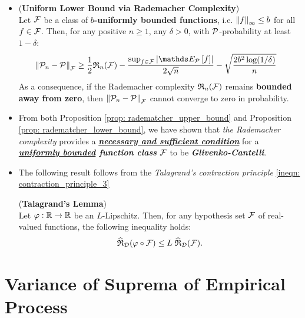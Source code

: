 \documentclass[11pt]{article}
\begin{document}
\begin{itemize}
\item \begin{proposition}\label{prop: radematcher_lower_bound}  (\textbf{Uniform Lower Bound via Rademacher Complexity}) \citep{wainwright2019high}\\
Let ${\mathcal F}$ be a class of \textbf{$b$-uniformly bounded functions}, i.e. $\left\|f\right\|_{\infty} \le b$ for all $f \in {\mathcal F}$. Then, for any positive $n \ge 1$, any $\delta > 0$, with ${\mathcal P}$-probability at least $1 - \delta$:
\begin{align}
\norm{\cP_n - \cP}{\cF} &\ge  \frac{1}{2} \frR_{n}(\cF)  - \frac{\sup_{f \in \cF}\abs{\E{\cP}{f}}}{2\sqrt{n}} - \sqrt{\frac{2 b^2 \log(1 / \delta)}{n}} \label{eqn: Rademacher_lower_bound}
\end{align} As a consequence, if the Rademacher complexity ${\mathfrak R}_n({\mathcal F})$ remains \textbf{bounded away from zero}, then $\left\|{\mathcal P}_n - {\mathcal P}\right\|_{{\mathcal F}}$ cannot
converge to zero in probability. 
\end{proposition}

\item \begin{remark} 
From both Proposition \ref{prop: radematcher_upper_bound} and Proposition \ref{prop: radematcher_lower_bound},  we have shown that \emph{the Rademacher complexity} provides a \underline{\emph{\textbf{necessary and sufficient condition}}} for a \emph{\textbf{\underline{uniformly bounded} function class} ${\mathcal F}$}  to be \emph{\textbf{Glivenko-Cantelli}}.
\end{remark}

\item The following result follows from the \emph{Talagrand's contraction principle} \eqref{ineqn: contraction_principle_3}
\begin{lemma} (\textbf{Talagrand's Lemma}) \citep{mohri2012foundations}\\
Let $\varphi: {\mathbb R} \to {\mathbb R}$ be an $L$-Lipschitz. Then, for any hypothesis set ${\mathcal F}$ of real-valued functions, the following inequality holds:
\begin{align}
\widehat{{\mathfrak R}}_{{\mathcal D}}(\varphi \circ {\mathcal F}) \le L \;\widehat{{\mathfrak R}}_{{\mathcal D}}({\mathcal F}). \label{ineqn: rademacher_complexity_contraction_lip}
\end{align}
\end{lemma}
\end{itemize}

\section{Variance of Suprema of Empirical Process}
\end{document}

